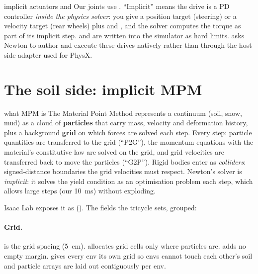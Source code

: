 \begin{isaacbox}{implicit actuators and }
Our joints use . ``Implicit'' means the drive is a
PD controller \emph{inside the physics solver}: you give a position target
(steering) or a velocity target (rear wheels) plus  and
, and the solver computes the torque as part of its implicit
step.  and  are written into
the simulator as hard limits.  asks
Newton to author and execute these drives natively rather than through the
host-side adapter used for PhysX.
\end{isaacbox}

\section{The soil side: implicit MPM}
\label{sec:mpm}

\begin{newtonbox}{what MPM is}
The Material Point Method represents a continuum (soil, snow, mud) as a
cloud of \textbf{particles} that carry mass, velocity and deformation
history, plus a background \textbf{grid} on which forces are solved each
step. Every step: particle quantities are transferred to the grid
(``P2G''), the momentum equations with the material's constitutive law are
solved on the grid, and grid velocities are transferred back to move the
particles (``G2P''). Rigid bodies enter as \emph{colliders}: signed-distance
boundaries the grid velocities must respect. Newton's solver is
\emph{implicit}: it solves the yield condition as an optimisation problem
each step, which allows large steps (our 10~ms) without exploding.
\end{newtonbox}

Isaac Lab exposes it as 
(). The fields the tricycle sets, grouped:

\paragraph{Grid.}
 is the grid spacing (5~cm). 
allocates grid cells only where particles are.  adds no
empty margin.  gives every env its own grid so
envs cannot touch each other's soil and particle arrays are laid out
contiguously per env.

